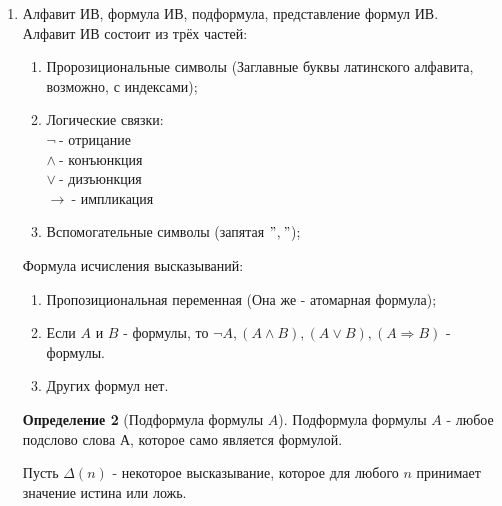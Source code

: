 \documentclass[a4paper]{article}
\theoremstyle{definition}
\newtheorem*{definition*}{Определение}
\begin{document}
\begin{enumerate}
       \begin{definition*}[Мощность множества]
        \textit{Мощность} множества $A$ - это единствееный кардинал, равномощный $A$, т.е. $|\mu_A|=|A|$.
       \end{definition*}
 \item Алфавит ИВ, формула ИВ, подформула, представление формул ИВ.
       \\ Алфавит ИВ состоит из трёх частей:
       \begin{enumerate}
        \item Пророзициональные символы (Заглавные буквы латинского алфавита, возможно, с индексами); \\
        \item Логические связки:\\
              $\lnot\ $- отрицание\\
              $\land\ $- конъюнкция\\
              $\lor\ $- дизъюнкция\\
              $\rightarrow\ $- импликация\\
        \item Вспомогательные символы (запятая $"$$,$$"$);
       \end{enumerate}
       Формула исчисления высказываний:
       \begin{enumerate}
        \item Пропозициональная переменная (Она же - атомарная формула);
        \item Если $A$ и $B$ - формулы, то $\lnot A, (A\land B), (A \lor B), (A \Rightarrow B)$ - формулы.
        \item Других формул нет.
       \end{enumerate}
       \begin{definition*}[Подформула формулы $A$]
        Подформула формулы $A$ - любое подслово слова А, которое само является формулой.
       \end{definition*}
       Пусть $\Delta(n)$ - некоторое высказывание, которое для любого $n$ принимает значение истина или ложь.


\end{enumerate}
\end{document}
